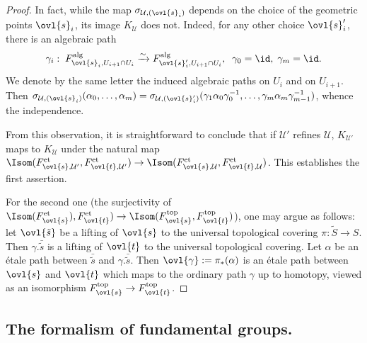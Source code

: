 \begin{proof}
 In fact, while the map $\sigma_{\mathcal{U},(\ovl{s}_i)}$ depends on the
 choice of the geometric points $\ovl{s}_i$, its image $K_\mathcal{U}$
 does not. Indeed, for any other choice $\ovl{s}'_i$, there is an
 algebraic path
 \begin{equation*}
  \gamma_i:\;F^{\mathrm{alg}}_{\ovl{s}_i, U_{i+1}\cap U_i} \xrightarrow{\sim}
   F^{\mathrm{alg}}_{\ovl{s}'_i, U_{i+1}\cap
   U_i},\;\;\gamma_0=\id,\;\gamma_m=\id.
 \end{equation*} 
 We denote by the same letter the induced algebraic
 paths on $U_i$ and on $U_{i+1}$. Then 
 $\sigma_{\mathcal{U},(\ovl{s}_i)}(\alpha_0,\ldots,\alpha_m) 
 =
 \sigma_{\mathcal{U},(\ovl{s}'_i)}(\gamma_1\alpha_0\gamma_0^{-1},\ldots,
 \gamma_{m}\alpha_m\gamma_{m-1}^{-1})$, whence the independence.

 From this observation, it is straightforward to conclude that if
 $\mathcal{U}'$ refines $\mathcal{U}$, $K_{\mathcal{U}'}$ maps to 
 $K_\mathcal{U} $ under the natural map
 $\Isom(F^{\mathrm{et}}_{\ovl{s},\mathcal{U}'},
 F^{\mathrm{et}}_{\ovl{t},\mathcal{U}'})\to
 \Isom(F^{\mathrm{et}}_{\ovl{s},\mathcal{U}},
 F^{\mathrm{et}}_{\ovl{t},\mathcal{U}})$. This establishes the first
 assertion.

 For the second one (the surjectivity of
 $\Isom(F_{\ovl{s}}^{\mathrm{et}}), F_{\ovl{t}}^{\mathrm{et}}) \to
 \Isom (F_{\ovl{s}}^{\mathrm{top}}, F_{\ovl{t}}^{\mathrm{top}})$), 
 one may argue as follows: let $\ovl{\tilde s}$ be a
 lifting of $\ovl{s}$ to the universal topological covering $\pi:\tilde
 S \to S$. Then $\gamma.\bar{\tilde s}$ is a lifting of $\ovl{t}$
 to the universal topological covering.  Let $\alpha$ be an \'etale path
 between $\bar{\tilde s}$ and $\gamma.\bar{\tilde s}$. Then
 $\ovl{\gamma}:=\pi_\ast(\alpha)$ is an \'etale path between $\ovl{s}$
 and $\ovl{t}$ which maps to the ordinary path $\gamma$ up to homotopy,
 viewed as an isomorphism $F_{\ovl{s}}^{\mathrm{top}}\to
 F_{\ovl{t}}^{\mathrm{top}}$.
\end{proof}


\subsection{The formalism of fundamental groups.}\label{sub::1.4}  
 
